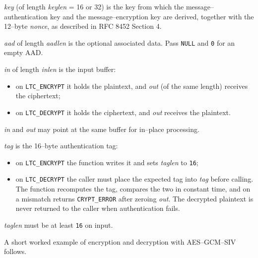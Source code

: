\documentclass[synpaper]{book}
\begin{document}
\textit{key} (of length \textit{keylen} = 16 or 32) is the key from which the message--authentication key and the message--encryption key
are derived, together with the 12--byte \textit{nonce}, as described in RFC 8452 Section 4.

\textit{aad} of length \textit{aadlen} is the optional associated data. Pass \texttt{NULL} and \texttt{0} for an empty AAD.

\textit{in} of length \textit{inlen} is the input buffer:
\begin{itemize}
   \item on \texttt{LTC\_ENCRYPT} it holds the plaintext, and \textit{out} (of the same length) receives the ciphertext;
   \item on \texttt{LTC\_DECRYPT} it holds the ciphertext, and \textit{out} receives the plaintext.
\end{itemize}

\textit{in} and \textit{out} may point at the same buffer for in--place processing.

\textit{tag} is the 16--byte authentication tag:
\begin{itemize}
   \item on \texttt{LTC\_ENCRYPT} the function writes it and sets \textit{taglen} to \texttt{16};
   \item on \texttt{LTC\_DECRYPT} the caller must place the expected tag into \textit{tag} before calling. The function recomputes the tag,
         compares the two in constant time, and on a mismatch returns \texttt{CRYPT\_ERROR} after zeroing \textit{out}. The decrypted
         plaintext is never returned to the caller when authentication fails.
\end{itemize}

\textit{taglen} must be at least \texttt{16} on input.

A short worked example of encryption and decryption with AES--GCM--SIV follows.
\end{document}
